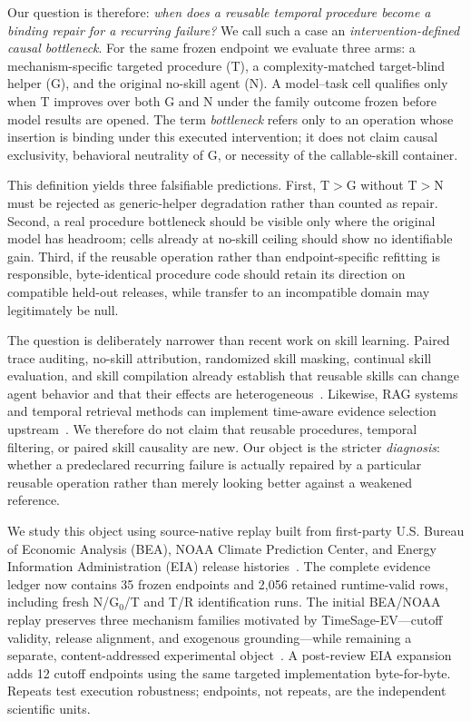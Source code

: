 Our question is therefore: \emph{when does a reusable temporal procedure become a binding repair for a recurring failure?} We call such a case an \emph{intervention-defined causal bottleneck}. For the same frozen endpoint we evaluate three arms: a mechanism-specific targeted procedure (T), a complexity-matched target-blind helper (G), and the original no-skill agent (N). A model--task cell qualifies only when T improves over both G and N under the family outcome frozen before model results are opened. The term \emph{bottleneck} refers only to an operation whose insertion is binding under this executed intervention; it does not claim causal exclusivity, behavioral neutrality of G, or necessity of the callable-skill container.

This definition yields three falsifiable predictions. First, T$>$G without T$>$N must be rejected as generic-helper degradation rather than counted as repair. Second, a real procedure bottleneck should be visible only where the original model has headroom; cells already at no-skill ceiling should show no identifiable gain. Third, if the reusable operation rather than endpoint-specific refitting is responsible, byte-identical procedure code should retain its direction on compatible held-out releases, while transfer to an incompatible domain may legitimately be null.

The question is deliberately narrower than recent work on skill learning. Paired trace auditing, no-skill attribution, randomized skill masking, continual skill evaluation, and skill compilation already establish that reusable skills can change agent behavior and that their effects are heterogeneous~\citep{zhou2026counterfactual,dong2026agentskills,wang2026notallskills,guan2026continualskillbench,wei2026evoharness,zheng2026skillprox,xu2026hyperskill}. Likewise, RAG systems and temporal retrieval methods can implement time-aware evidence selection upstream~\citep{asai2024selfrag,yan2024crag,han2025temporalgraphs,wang2026iarag}. We therefore do not claim that reusable procedures, temporal filtering, or paired skill causality are new. Our object is the stricter \emph{diagnosis}: whether a predeclared recurring failure is actually repaired by a particular reusable operation rather than merely looking better against a weakened reference.

We study this object using source-native replay built from first-party U.S. Bureau of Economic Analysis (BEA), NOAA Climate Prediction Center, and Energy Information Administration (EIA) release histories~\citep{bea2026archive,noaa2026enso,eia2026wpsrarchive}. The complete evidence ledger now contains 35 frozen endpoints and 2,056 retained runtime-valid rows, including fresh N/G$_0$/T and T/R identification runs. The initial BEA/NOAA replay preserves three mechanism families motivated by TimeSage-EV---cutoff validity, release alignment, and exogenous grounding---while remaining a separate, content-addressed experimental object~\citep{yao2026timesage}. A post-review EIA expansion adds 12 cutoff endpoints using the same targeted implementation byte-for-byte. Repeats test execution robustness; endpoints, not repeats, are the independent scientific units.


